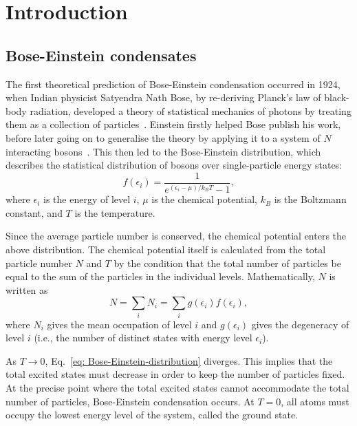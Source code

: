 \chapter{Introduction}\label{chap: intro}


\section{Bose-Einstein condensates}
The first theoretical prediction of Bose-Einstein condensation occurred in 1924,
when Indian physicist Satyendra Nath Bose, by re-deriving Planck's law of
black-body radiation, developed a theory of statistical mechanics of photons
by treating them as a collection of particles~\cite{Bose1924}.
Einstein firstly helped Bose publish his work, before later going on to
generalise the theory by applying it to a system of \(N\) interacting
bosons~\cite{Einstein2005}.
This then led to the Bose-Einstein distribution, which describes the
statistical distribution of bosons over single-particle energy states:
\begin{equation}\label{eq: Bose-Einstein-distribution}
    f(\epsilon_i) = \frac{1}{e^{(\epsilon_i-\mu)/k_B T} - 1},
\end{equation}
where \(\epsilon_i\) is the energy of level \(i\), \(\mu \) is the chemical
potential, \(k_B\) is the Boltzmann constant, and \(T\) is the temperature.

Since the average particle number is conserved, the chemical potential enters
the above distribution.
The chemical potential itself is calculated from the total particle number \(N\)
and \(T\) by the condition that the total number of particles be equal to the
sum of the particles in the individual levels.
Mathematically, \(N\) is written as
\begin{equation}
    N = \sum_i N_i = \sum_i g(\epsilon_i)f(\epsilon_i),
\end{equation}
where \(N_i\) gives the mean occupation of level \(i\) and \(g(\epsilon_i)\)
gives the degeneracy of level \(i\) (i.e., the number of distinct states with
energy level \(\epsilon_i\)).

As \(T \rightarrow 0\), Eq.~\eqref{eq: Bose-Einstein-distribution} diverges.
This implies that the total excited states must decrease in order to keep
the number of particles fixed.
At the precise point where the total excited states cannot accommodate the total
number of particles, Bose-Einstein condensation occurs.
At \(T=0\), all atoms must occupy the lowest energy level of the system, called
the ground state.

